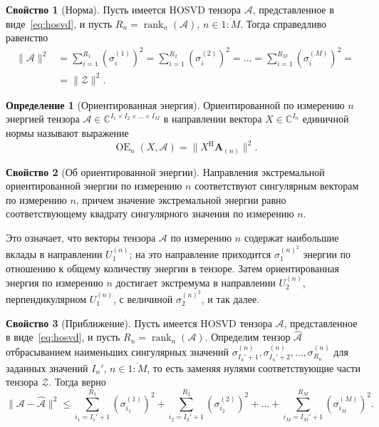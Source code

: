 \documentclass[specialist,
    substylefile = spbu_report.rtx,
    subf,href,colorlinks=true, 12pt]{disser}
\theoremstyle{plain}
\theoremstyle{definition}
\newtheorem{definition}{Определение}[section]
\newtheorem{property}{Свойство}[section]
\theoremstyle{remark}
\begin{document}
    \begin{property}[Норма]
        \label{property:norm}
        Пусть имеется HOSVD тензора $\mathcal{A}$, представленное в виде~\eqref{eq:hosvd}, и пусть $R_n=\operatorname{rank}_n(\mathcal{A})$,
        $n\in \overline{1:M}$.
        Тогда справедливо равенство
        \begin{align*}
            \|\mathcal{A}\|^2&=\sum_{i=1}^{R_1}\left( \sigma_i^{(1)} \right)^2=\sum_{i=1}^{R_2}\left( \sigma_i^{(2)} \right)^2
            =\ldots =\sum_{i=1}^{R_M}\left( \sigma_i^{(M)} \right)^2=\\
            &= \|\mathcal{Z}\|^2.
        \end{align*}
    \end{property}

    \begin{definition}[Ориентированная энергия]
        Ориентированной по измерению $n$ энергией тензора $\mathcal{A}\in \mathbb{C}^{I_1\times I_2\times \ldots \times I_M}$ в направлении
        вектора $X\in \mathbb{C}^{I_n}$ единичной нормы называют выражение
        \[
            \operatorname{OE}_n(X, \mathcal{A}) = \|X^{\mathrm{H}}\mathbf{A}_{(n)}\|^2.
        \]
    \end{definition}

    \begin{property}[Об ориентированной энергии]
        \label{property:oriented-energy}
        Направления экстремальной ориентированной энергии по измерению $n$ соответствуют сингулярным векторам по измерению $n$,
        причем значение экстремальной энергии равно соответствующему квадрату сингулярного значения по измерению $n$.
    \end{property}

    Это означает, что векторы тензора $\mathcal{A}$ по измерению $n$ содержат наибольшие вклады в
    направлении $U^{(n)}_1$;
    на это направление приходится $\sigma^{(n)^2}_1$ энергии по отношению к общему количеству энергии в тензоре.
    Затем ориентированная энергия по измерению $n$ достигает экстремума в направлении $U^{(n)}_2$,
    перпендикулярном $U^{(n)}_1$, с величиной $\sigma^{(n)^2}_2$, и так далее.

    \begin{property}[Приближение]
        \label{property:approx}
        Пусть имеется HOSVD тензора $\mathcal{A}$, представленное в виде~\eqref{eq:hosvd}, и пусть $R_n=\operatorname{rank}_n(\mathcal{A})$.
        Определим тензор $\hat{\mathcal{A}}$ отбрасыванием наименьших сингулярных значений $\sigma_{I_{n}'+1}^{(n)}, \sigma_{I_{n}'+2}^{(n)},\ldots, \sigma_{R_n}^{(n)}$
        для заданных значений $I_{n}'$, $n \in \overline{1:M}$, то есть заменяя нулями соответствующие части тензора $\mathcal{Z}$.
        Тогда верно
        \begin{equation}
            \|\mathcal{A}-\hat{\mathcal{A}}\|^2\leqslant \sum_{i_1=I_{1}'+1}^{R_1}\left( \sigma_{i_1}^{(1)}\right)^2 +
            \sum_{i_2=I_{2}'+1}^{R_2}\left( \sigma_{i_2}^{(2)}\right)^2 + \ldots + \sum_{i_M=I_{M}'+1}^{R_M}\left( \sigma_{i_M}^{(M)}\right)^2.\label{eq:approx}
        \end{equation}
    \end{property}
\end{document}
